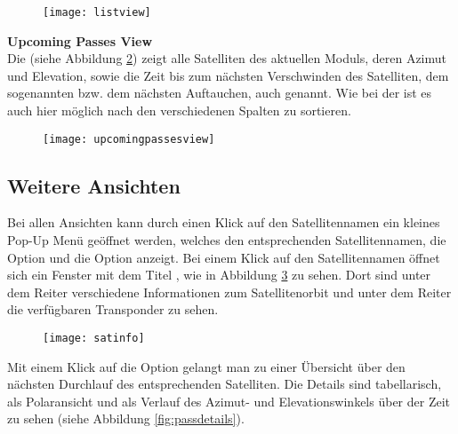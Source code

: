 \begin{figure}[h]
	\centering
	\texttt{[image: listview]}
	\caption{}
	\label{fig:listview} 
\end{figure}

\textbf{Upcoming Passes View}\\
Die  (siehe Abbildung \ref{fig:upcomingpassesview}) zeigt alle Satelliten des aktuellen Moduls, deren Azimut und Elevation, sowie die Zeit bis zum nächsten Verschwinden des Satelliten, dem sogenannten  bzw. dem nächsten Auftauchen, auch  genannt. Wie bei der  ist es auch hier möglich nach den verschiedenen Spalten zu sortieren.

\begin{figure}[h]
	\centering
	\texttt{[image: upcomingpassesview]}
	\caption{}
	\label{fig:upcomingpassesview} 
\end{figure}

\clearpage

\subsection{Weitere Ansichten}

Bei allen Ansichten kann durch einen Klick auf den Satellitennamen ein kleines Pop-Up Menü geöffnet werden, welches den entsprechenden Satellitennamen, die Option  und die Option  anzeigt. Bei einem Klick auf den Satellitennamen öffnet sich ein Fenster mit dem Titel , wie in Abbildung \ref{fig:satinfo} zu sehen. Dort sind unter dem Reiter  verschiedene Informationen zum Satellitenorbit und unter dem Reiter  die verfügbaren Transponder zu sehen.


\begin{figure}[h]
	\centering
	\texttt{[image: satinfo]}
	\caption{}
	\label{fig:satinfo} 
\end{figure}

Mit einem Klick auf die Option  gelangt man zu einer Übersicht über den nächsten Durchlauf des entsprechenden Satelliten. Die Details sind tabellarisch, als Polaransicht und als Verlauf des Azimut- und Elevationswinkels über der Zeit zu sehen (siehe Abbildung \ref{fig:passdetails}).

